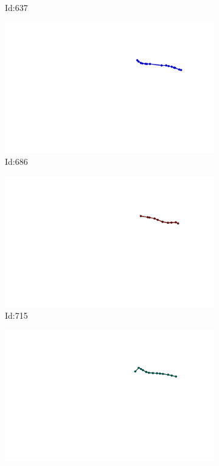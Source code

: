\documentclass[12pt,twoside]{report}
\begin{document}
\begin{figure}
\begin{subfigure}[b]{0.20\textwidth}
\caption{Id:637}
\end{subfigure}
\begin{subfigure}[b]{0.20\textwidth}
\centering
\includegraphics[width=\textwidth]{../trajectories/686.png}
\caption{Id:686}
\end{subfigure}
\begin{subfigure}[b]{0.20\textwidth}
\centering
\includegraphics[width=\textwidth]{../trajectories/715.png}
\caption{Id:715}
\end{subfigure}
\begin{subfigure}[b]{0.20\textwidth}
\centering
\includegraphics[width=\textwidth]{../trajectories/825.png}

\end{subfigure}
\end{figure}
\end{document}
